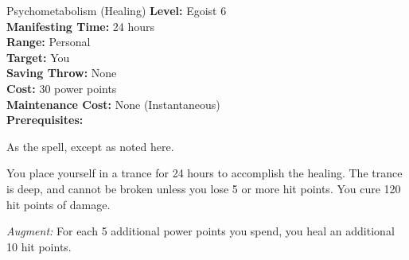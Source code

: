 {Psychometabolism (Healing)}
{
	\textbf{Level:}
	Egoist 6\\
	\textbf{Manifesting Time:}
	24 hours\\
	\textbf{Range:}
	Personal\\
	\textbf{Target:}
	You\\
	\textbf{Saving Throw:}
	None\\
	\textbf{Cost:}
	30 power points\\
	\textbf{Maintenance Cost:}
	None (Instantaneous)\\
	\textbf{Prerequisites:}
	\\
}
{
	As the  spell, except as noted here.

	You place yourself in a trance for 24 hours to accomplish the healing. The trance is deep, and cannot be broken unless you lose 5 or more hit points. You cure 120 hit points of damage.

	\textit{Augment:} For each 5 additional power points you spend, you heal an additional 10 hit points.
}